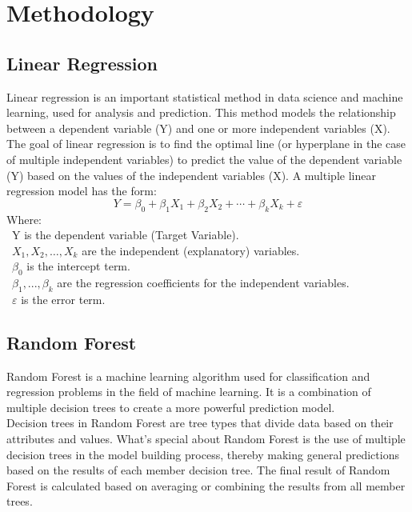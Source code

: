\documentclass{ieeeojies}
\begin{document}
\section{Methodology}
\subsection{Linear Regression}
Linear regression is an important statistical method in data science and machine learning, used for analysis and prediction. This method models the relationship between a dependent variable (Y) and one or more independent variables (X). The goal of linear regression is to find the optimal line (or hyperplane in the case of multiple independent variables) to predict the value of the dependent variable (Y) based on the values of the independent variables (X).
A multiple linear regression model has the form: 
\[Y=\beta_0+\beta_1X_1+\beta_2X_2+\cdots+\beta_kX_k+\varepsilon\]
Where:\\
	\indent\textbullet\ Y is the dependent variable (Target Variable).\\
	\indent\textbullet\ \(X_1, X_2, \ldots, X_k\) are the independent (explanatory) variables.\\
	\indent\textbullet\ \(\beta_0\) is the intercept term.\\
	\indent\textbullet\ \(\beta_1,..., \beta_k\) are the regression coefficients for the independent variables.\\
	\indent\textbullet\ \(\varepsilon\) is the error term.

\subsection{Random Forest}

Random Forest is a machine learning algorithm used for classification and regression problems in the field of machine learning. It is a combination of multiple decision trees to create a more powerful prediction model. \\

Decision trees in Random Forest are tree types that divide data based on their attributes and values. What's special about Random Forest is the use of multiple decision trees in the model building process, thereby making general predictions based on the results of each member decision tree. The final result of Random Forest is calculated based on averaging or combining the results from all member trees. \\
\end{document}
